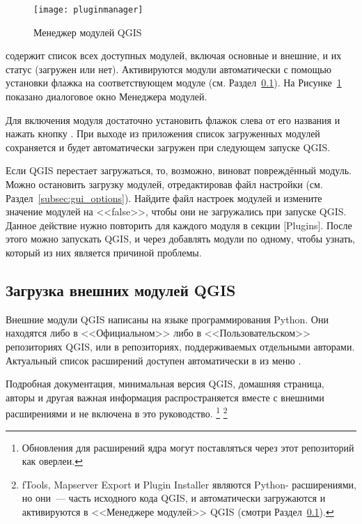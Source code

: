 \begin{figure}[ht]
   \centering
   \texttt{[image: pluginmanager]}
   \caption{Менеджер модулей QGIS \wincaption}\label{fig:pluginmanager}\smallskip
\end{figure}

 содержит список всех доступных модулей,
включая основные и внешние, и их статус (загружен или нет).
Активируются модули автоматически с помощью установки флажка на соответствующем
модуле (см. Раздел~\ref{sec:load_external_plugin}).
На Рисунке~\ref{fig:pluginmanager} показано диалоговое окно Менеджера
модулей.

Для включения модуля достаточно установить флажок слева от его названия
и нажать кнопку . При выходе из приложения список
загруженных модулей сохраняется и будет автоматически загружен при
следующем запуске QGIS.

\begin{Tip}\caption{\textsc{Повреждённые модули}}
Если QGIS перестает загружаться, то, возможно, виноват повреждённый
модуль. Можно остановить загрузку модулей, отредактировав файл настройки
(см. Раздел~\ref{subsec:gui_options}). Найдите файл настроек модулей и
измените значение модулей на <<false>>, чтобы они не загружались при
запуске QGIS.
\normalfont
Данное действие нужно повторить для каждого модуля в секции [Plugins].
После этого можно запускать QGIS, и через 
добавлять модули по одному, чтобы узнать, который из них является
причиной проблемы.
\end{Tip}

\subsection{Загрузка внешних модулей QGIS}\label{sec:load_external_plugin}

Внешние модули QGIS написаны на языке программирования Python. Они находятся
либо в <<Официальном>> либо в <<Пользовательском>> репозиториях QGIS, или
в репозиториях, поддерживаемых отдельными авторами. Актуальный список
расширений доступен автоматически в 
из меню .

Подробная документация, минимальная версия QGIS, домашняя страница, авторы
и другая важная информация распространяется вместе с внешними расширениями
и не включена в это руководство.
\footnote{Обновления для расширений ядра могут поставляться через этот
репозиторий как оверлеи.}
\footnote{fTools, Mapserver Export и Plugin Installer являются Python-
расширениями, но они~--- часть исходного кода QGIS, и автоматически
загружаются и активируются в <<Менеджере модулей>> QGIS
(смотри Раздел~\ref{sec:load_external_plugin}).}

